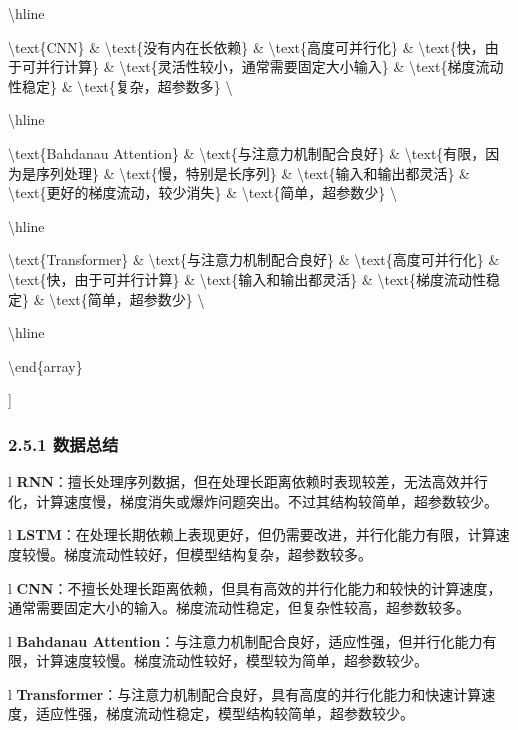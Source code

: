 \textbackslash hline

\textbackslash text\{CNN\} \& \textbackslash text\{没有内在长依赖\} \&
\textbackslash text\{高度可并行化\} \&
\textbackslash text\{快，由于可并行计算\} \&
\textbackslash text\{灵活性较小，通常需要固定大小输入\} \&
\textbackslash text\{梯度流动性稳定\} \&
\textbackslash text\{复杂，超参数多\} \textbackslash{}

\textbackslash hline

\textbackslash text\{Bahdanau Attention\} \&
\textbackslash text\{与注意力机制配合良好\} \&
\textbackslash text\{有限，因为是序列处理\} \&
\textbackslash text\{慢，特别是长序列\} \&
\textbackslash text\{输入和输出都灵活\} \&
\textbackslash text\{更好的梯度流动，较少消失\} \&
\textbackslash text\{简单，超参数少\} \textbackslash{}

\textbackslash hline

\textbackslash text\{Transformer\} \&
\textbackslash text\{与注意力机制配合良好\} \&
\textbackslash text\{高度可并行化\} \&
\textbackslash text\{快，由于可并行计算\} \&
\textbackslash text\{输入和输出都灵活\} \&
\textbackslash text\{梯度流动性稳定\} \&
\textbackslash text\{简单，超参数少\} \textbackslash{}

\textbackslash hline

\textbackslash end\{array\}

{]}

\subsubsection{\texorpdfstring{\textbf{2.5.1
数据总结}}{2.5.1 数据总结}}\label{251-ux6570ux636eux603bux7ed3}

l
\textbf{RNN}：擅长处理序列数据，但在处理长距离依赖时表现较差，无法高效并行化，计算速度慢，梯度消失或爆炸问题突出。不过其结构较简单，超参数较少。

l
\textbf{LSTM}：在处理长期依赖上表现更好，但仍需要改进，并行化能力有限，计算速度较慢。梯度流动性较好，但模型结构复杂，超参数较多。

l
\textbf{CNN}：不擅长处理长距离依赖，但具有高效的并行化能力和较快的计算速度，通常需要固定大小的输入。梯度流动性稳定，但复杂性较高，超参数较多。

l \textbf{Bahdanau
Attention}：与注意力机制配合良好，适应性强，但并行化能力有限，计算速度较慢。梯度流动性较好，模型较为简单，超参数较少。

l
\textbf{Transformer}：与注意力机制配合良好，具有高度的并行化能力和快速计算速度，适应性强，梯度流动性稳定，模型结构较简单，超参数较少。

